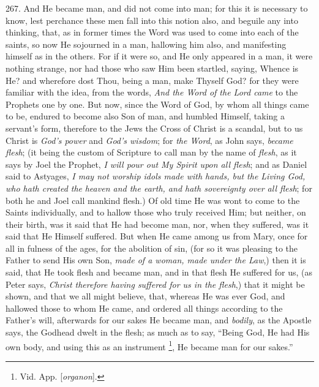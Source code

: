 267.
And He became man, and did not come into man; for this it is necessary
to know, lest perchance these men fall into this notion also, and
beguile any into thinking, that, as in former times the Word was used
to come into each of the saints, so now He sojourned in a man,
hallowing him also, and manifesting himself as in the others. For if
it were so, and He only appeared in a man, it were nothing strange,
nor had those who saw Him been startled, saying, Whence is He? and
wherefore dost Thou, being a man, make Thyself God? for they were
familiar with the idea, from the words, \emph{And the Word of the Lord
came} to the Prophets one by one. But now, since the Word of God,
by whom all things came to be, endured to become also Son of man, and
humbled Himself, taking a servant's form, therefore to the Jews the
Cross of Christ is a scandal, but to us Christ is \emph{God's power}
and \emph{God's wisdom}; for \emph{the Word}, as John says, \emph{became
flesh}; (it being the custom of Scripture to call man by the name
of \emph{flesh}, as it says by Joel the Prophet, \emph{I will pour out My
Spirit upon all flesh}; and as Daniel said to Astyages, \emph{I may
not worship idols made with hands, but the Living God, who hath
created the} \emph{heaven and the earth, and hath sovereignty
over all flesh}; for both he and Joel call mankind flesh.) Of old
time He was wont to come to the Saints individually, and to hallow
those who truly received Him; but neither, on their birth, was it said
that He had become man, nor, when they suffered, was it said that He
Himself suffered. But when He came among us from Mary, once for all in
fulness of the ages, for the abolition of sin, (for so it was pleasing
to the Father to send His own Son, \emph{made of a woman, made under the
Law},) then it is said, that He took flesh and became man, and in
that flesh He suffered for us, (as Peter says, \emph{Christ therefore
having suffered for us in the flesh},) that it might be shown, and
that we all might believe, that, whereas He was ever God, and hallowed
those to whom He came, and ordered all things according to the Father's
will, afterwards for our sakes He became man, and \emph{bodily}, as
the Apostle says, the Godhead dwelt in the flesh; as much as to say, ``Being
God, He had His own body, and using this as an instrument \footnote{Vid. App. [\emph{organon}].}, He became man for our sakes.''

